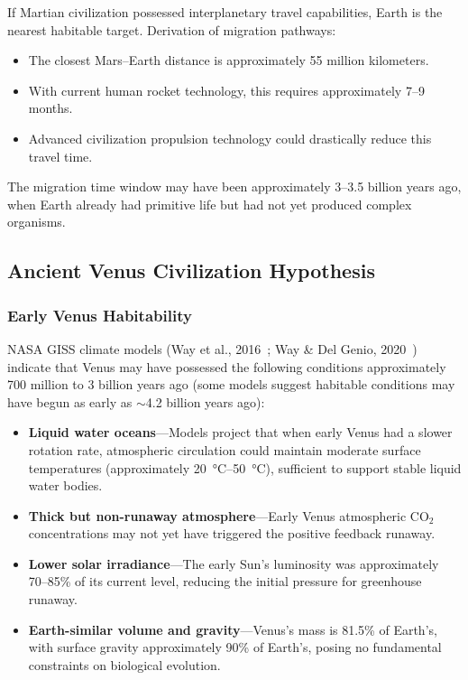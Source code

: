 \documentclass[aps,prd,twocolumn,superscriptaddress,nofootinbib]{revtex4-2}
\begin{document}
If Martian civilization possessed interplanetary travel capabilities, Earth is the nearest habitable target. Derivation of migration pathways:

\begin{itemize}
  \item The closest Mars--Earth distance is approximately 55 million kilometers.
  \item With current human rocket technology, this requires approximately 7--9 months.
  \item Advanced civilization propulsion technology could drastically reduce this travel time.
\end{itemize}

The migration time window may have been approximately 3--3.5 billion years ago, when Earth already had primitive life but had not yet produced complex organisms.

\subsection{Ancient Venus Civilization Hypothesis}\label{sec:venus-civ}

\subsubsection{Early Venus Habitability}\label{sec:venus-habit}

NASA GISS climate models (Way et al., 2016~\cite{Way2016}; Way \& Del Genio, 2020~\cite{Way2020}) indicate that Venus may have possessed the following conditions approximately 700 million to 3 billion years ago (some models suggest habitable conditions may have begun as early as ${\sim}$4.2 billion years ago):

\begin{itemize}
  \item \textbf{Liquid water oceans}---Models project that when early Venus had a slower rotation rate, atmospheric circulation could maintain moderate surface temperatures (approximately \SIrange{20}{50}{\degreeCelsius}), sufficient to support stable liquid water bodies.
  \item \textbf{Thick but non-runaway atmosphere}---Early Venus atmospheric CO$_2$ concentrations may not yet have triggered the positive feedback runaway.
  \item \textbf{Lower solar irradiance}---The early Sun's luminosity was approximately 70--85\% of its current level, reducing the initial pressure for greenhouse runaway.
  \item \textbf{Earth-similar volume and gravity}---Venus's mass is 81.5\% of Earth's, with surface gravity approximately 90\% of Earth's, posing no fundamental constraints on biological evolution.
\end{itemize}
\end{document}
